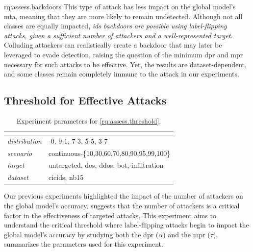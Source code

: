 \begin{answerbox}{rq:assess.backdoors}
  This type of attack has less impact on the global model's \gls{mta}, meaning that they are more likely to remain undetected.
  Although not all classes are equally impacted, \emph{\gls{ids} backdoors are possible using label-flipping attacks, given a sufficient number of attackers and a well-represented target.}
  Colluding attackers can realistically create a backdoor that may later be leveraged to evade detection, raising the question of the minimum \gls{dpr} and \gls{mpr} necessary for such attacks to be effective.
  Yet, the results are dataset-dependent, and some classes remain completely immune to the attack in our experiments.
\end{answerbox}



\subsection{Threshold for Effective Attacks\label{sec:results.impact}}

\begin{table}
  \caption{
    Experiment parameters for \ref{rq:assess.threshold}.
    \label{tbl:assess.threshold}
  }
  \small
  \begin{tabular}{>{\ttfamily\itshape}p{} >{\ttfamily}p{}}
    \toprule
    \multicolumn{2}{>{\bfseries}p{.9\columnwidth}}{\rqthreshold} \\
    \midrule
    distribution & 10-0, 9-1, 7-3, 5-5, 3-7 \\
    scenario & continuous-\{10,30,60,70,80,90,95,99,100\} \\
    target & untargeted, dos, ddos, bot, infiltration \\
    dataset & cicids, nb15 \\
    \bottomrule
  \end{tabular}
\end{table}


Our previous experiments highlighted the impact of the number of attackers on the global model's accuracy.
 suggests that the number of attackers is a critical factor in the effectiveness of targeted attacks.
This experiment aims to understand the critical threshold where label-flipping attacks begin to impact the global model's accuracy by studying both the \gls{dpr} ($\alpha$) and the \gls{mpr} ($\tau$).
 summarizes the parameters used for this experiment.

